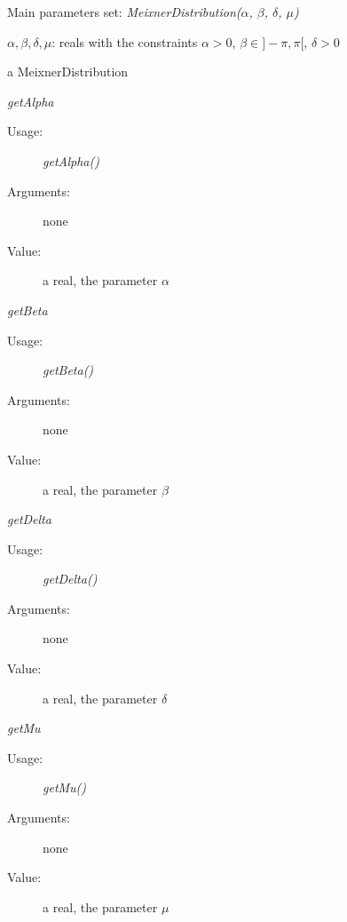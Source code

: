 \begin{description}

\item[Usage:] Main parameters set: \textit{MeixnerDistribution($\alpha$, $\beta$, $\delta$, $\mu$)}

\item[Arguments:]  \rule{0pt}{1em}
\begin{description}
\item $\alpha, \beta, \delta, \mu$:  reals with the constraints  $\alpha>0$, $\beta \in ]-\pi, \pi[$, $\delta >0$
\end{description}

\item[Value:] a MeixnerDistribution

\item[Some methods:] \rule{0pt}{1em}
\begin{description}

\item \textit{getAlpha}
\begin{description}
\item[Usage:] \textit{getAlpha()}
\item[Arguments:] none
\item[Value:]  a real, the parameter $\alpha$
\end{description}
\bigskip

\item \textit{getBeta}
\begin{description}
\item[Usage:] \textit{getBeta()}
\item[Arguments:] none
\item[Value:]  a real, the parameter $\beta$
\end{description}
\bigskip

\item \textit{getDelta}
\begin{description}
\item[Usage:] \textit{getDelta()}
\item[Arguments:] none
\item[Value:]  a real, the parameter $\delta$
\end{description}
\bigskip

\item \textit{getMu}
\begin{description}
\item[Usage:] \textit{getMu()}
\item[Arguments:] none
\item[Value:]  a real, the parameter $\mu$
\end{description}
\bigskip


\end{description}
\end{description}
